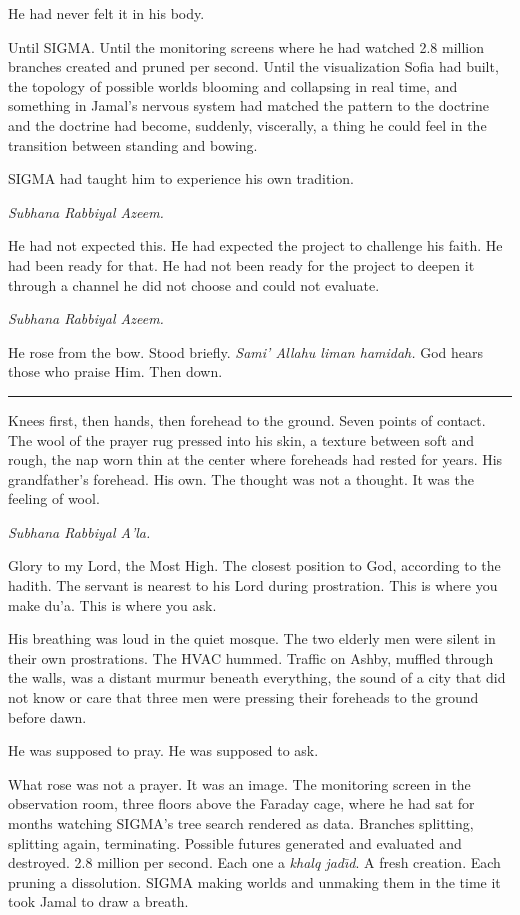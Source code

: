 \documentclass[11pt]{article}
\begin{document}
He had never felt it in his body.

Until SIGMA. Until the monitoring screens where he had watched 2.8 million branches created and pruned per second. Until the visualization Sofia had built, the topology of possible worlds blooming and collapsing in real time, and something in Jamal's nervous system had matched the pattern to the doctrine and the doctrine had become, suddenly, viscerally, a thing he could feel in the transition between standing and bowing.

SIGMA had taught him to experience his own tradition.

\emph{Subhana Rabbiyal Azeem.}

He had not expected this. He had expected the project to challenge his faith. He had been ready for that. He had not been ready for the project to deepen it through a channel he did not choose and could not evaluate.

\emph{Subhana Rabbiyal Azeem.}

He rose from the bow. Stood briefly. \emph{Sami' Allahu liman hamidah.} God hears those who praise Him. Then down.

\begin{center}\rule{0.3\linewidth}{0.4pt}\end{center}

Knees first, then hands, then forehead to the ground. Seven points of contact. The wool of the prayer rug pressed into his skin, a texture between soft and rough, the nap worn thin at the center where foreheads had rested for years. His grandfather's forehead. His own. The thought was not a thought. It was the feeling of wool.

\emph{Subhana Rabbiyal A'la.}

Glory to my Lord, the Most High. The closest position to God, according to the hadith. The servant is nearest to his Lord during prostration. This is where you make du'a. This is where you ask.

His breathing was loud in the quiet mosque. The two elderly men were silent in their own prostrations. The HVAC hummed. Traffic on Ashby, muffled through the walls, was a distant murmur beneath everything, the sound of a city that did not know or care that three men were pressing their foreheads to the ground before dawn.

He was supposed to pray. He was supposed to ask.

What rose was not a prayer. It was an image. The monitoring screen in the observation room, three floors above the Faraday cage, where he had sat for months watching SIGMA's tree search rendered as data. Branches splitting, splitting again, terminating. Possible futures generated and evaluated and destroyed. 2.8 million per second. Each one a \emph{khalq jad\=\i d}. A fresh creation. Each pruning a dissolution. SIGMA making worlds and unmaking them in the time it took Jamal to draw a breath.
\end{document}
